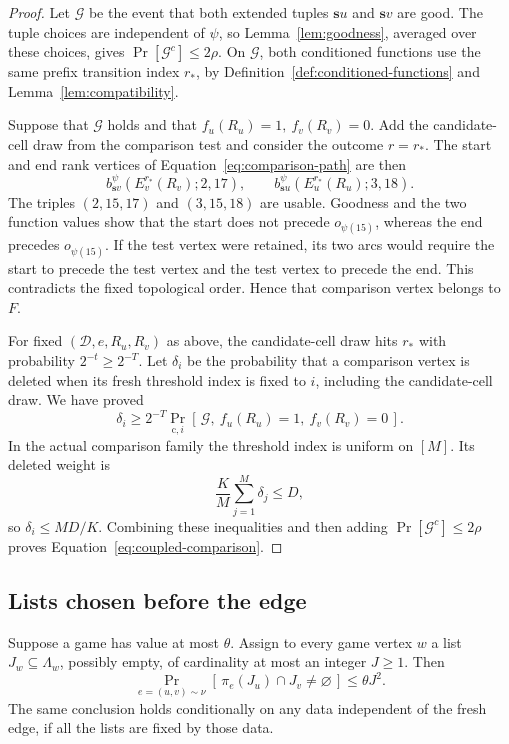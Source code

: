 \begin{proof}
Let \(\mathcal G\) be the event that both extended tuples
\(\mathbf s u\) and \(\mathbf s v\) are good.  The tuple choices
are independent of \(\psi\), so Lemma~\ref{lem:goodness}, averaged
over these choices, gives \(\Pr[\mathcal G^c]\le2\rho\).
On \(\mathcal G\), both conditioned functions use the same prefix
transition index \(r_*\), by Definition~\ref{def:conditioned-functions}
and Lemma~\ref{lem:compatibility}.

Suppose that \(\mathcal G\) holds and that
\(f_u(R_u)=1,\ f_v(R_v)=0\).  Add the candidate-cell draw from
the comparison test and consider the outcome \(r=r_*\).
The start and end rank vertices of Equation~\eqref{eq:comparison-path}
are then
\[
  b_{\mathbf s v}^{\psi}
      (E_v^{r_*}(R_v);2,17),
  \qquad
  b_{\mathbf s u}^{\psi}
      (E_u^{r_*}(R_u);3,18).
\]
The triples \((2,15,17)\) and \((3,15,18)\) are usable.
Goodness and the two function values show that the start does not
precede \(o_{\psi(15)}\), whereas the end precedes \(o_{\psi(15)}\).
If the test vertex were retained, its two arcs would require the
start to precede the test vertex and the test vertex to precede the
end.  This contradicts the fixed topological order.  Hence that
comparison vertex belongs to \(F\).

For fixed \((\mathcal D,e,R_u,R_v)\) as above, the candidate-cell
draw hits \(r_*\) with probability \(2^{-t}\ge2^{-T}\).
Let \(\delta_i\) be the probability that a comparison vertex is
deleted when its fresh threshold index is fixed to \(i\), including
the candidate-cell draw.  We have proved
\[
  \delta_i\ge
   2^{-T}\Pr_{\mathrm c,i}
     [\,\mathcal G,\ f_u(R_u)=1,\ f_v(R_v)=0\,].
\]
In the actual comparison family the threshold index is uniform on
\([M]\).  Its deleted weight is
\[
  \frac K M\sum_{j=1}^{M}\delta_j\le D,
\]
so \(\delta_i\le MD/K\).
Combining these inequalities and then adding
\(\Pr[\mathcal G^c]\le2\rho\) proves
Equation~\eqref{eq:coupled-comparison}.
\end{proof}

\subsection{Lists chosen before the edge}

\begin{lemma}
\label{lem:list-decoding}
Suppose a game has value at most \(\theta\).
Assign to every game vertex \(w\) a list
\(J_w\subseteq\Lambda_w\), possibly empty, of cardinality at most
an integer \(J\ge1\).  Then
\[
  \Pr_{e=(u,v)\sim\nu}
    [\,\pi_e(J_u)\cap J_v\ne\varnothing\,]\le\theta J^2.
\]
The same conclusion holds conditionally on any data independent of
the fresh edge, if all the lists are fixed by those data.
\end{lemma}

